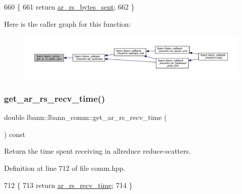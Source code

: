 \begin{DoxyCode}
660                                              \{
661     \textcolor{keywordflow}{return} \hyperlink{classlbann_1_1lbann__comm_ac74bcfb565c1bb6604f336c6d1b647cc}{ar\_rs\_bytes\_sent};
662   \}
\end{DoxyCode}
Here is the caller graph for this function\+:\nopagebreak
\begin{figure}[H]
\begin{center}
\leavevmode
\includegraphics[width=350pt]{classlbann_1_1lbann__comm_a7b9827e5f46d535c8ab2cf2f6c576291_icgraph}
\end{center}
\end{figure}
\mbox{\label{classlbann_1_1lbann__comm_ab3474bd1c09ca432e302279acfd83307}} 
\subsubsection{\texorpdfstring{get\+\_\+ar\+\_\+rs\+\_\+recv\+\_\+time()}{get\_ar\_rs\_recv\_time()}}
{\footnotesize\ttfamily double lbann\+::lbann\+\_\+comm\+::get\+\_\+ar\+\_\+rs\+\_\+recv\+\_\+time (\begin{DoxyParamCaption}{ }\end{DoxyParamCaption}) const\hspace{0.3cm}{\ttfamily [inline]}}

Return the time spent receiving in allreduce reduce-\/scatters. 

Definition at line 712 of file comm.\+hpp.


\begin{DoxyCode}
712                                             \{
713     \textcolor{keywordflow}{return} \hyperlink{classlbann_1_1lbann__comm_adefa0ee8b0a6b74072448e20d40f502d}{ar\_rs\_recv\_time};
714   \}
\end{DoxyCode}
\mbox{\label{classlbann_1_1lbann__comm_a7222cd0613d9a94eafc89c51bfeae20d}} 
